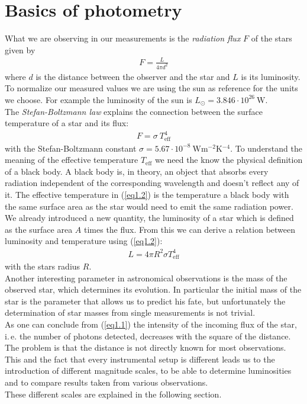 \section{Basics of photometry}
What we are observing in our measurements is the \textit{radiation flux} $F$ of the stars given by
\begin{align}
	F = \frac{L}{4\pi d^2}\label{eq1.1}
\end{align}
where $d$ is the distance between the observer and the star and $L$ is its luminosity. \\
To normalize our measured values we are using the sun as reference for the units we choose. For example the luminosity of the sun is 
	$ L_{\odot} = 3.846 \cdot 10^{26} \ \si{\watt}$. \\	
The \textit{Stefan-Boltzmann law} explains the connection between the surface temperature of a star and its flux:
\begin{align}
	F = \sigma \ T_{\text{eff}}^4\label{eq1.2}
\end{align}
with the Stefan-Boltzmann constant $\sigma = 5.67 \cdot 10^{-8} \ \si{\watt\meter^{-2}\kelvin^{-4}}$. To understand the meaning of the effective temperature $T_{\text{eff}}$ we need the know the physical definition of a black body. A black body is, in theory, an object that absorbs every radiation independent of the corresponding wavelength and doesn't reflect any of it. The effective temperature in (\ref{eq1.2}) is the temperature a black body with the same surface area as the star would need to emit the same radiation power. \\
We already introduced a new quantity, the luminosity of a star which is defined as the surface area $A$ times the flux. From this we can derive a relation between luminosity and temperature using (\ref{eq1.2}):
\begin{align}
	L = 4\pi R^2\sigma T_{\text{eff}}^4
\end{align}
with the stars radius $R$. \\
Another interesting parameter in astronomical observations is the mass of the observed star, which determines its  evolution. In particular the initial mass of the star is the parameter that allows us to predict his fate, but unfortunately the determination of star masses from single measurements is not trivial. \\
As one can conclude from (\ref{eq1.1}) the intensity of the incoming flux of the star, i.\,e. the number of photons detected, decreases with the square of the distance. The problem is that the distance is not directly known for most observations. This and the fact that every instrumental setup is different leads us to the introduction of different magnitude scales, to be able to determine luminosities and to compare results taken from various observations. \\
These different scales are explained in the following section.

